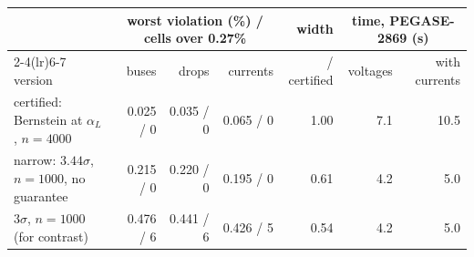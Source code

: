 \begin{tabular}{lrrrrrr}
\toprule
 & \multicolumn{3}{c}{worst violation (\%) / cells over 0.27\%} & width & \multicolumn{2}{c}{time, PEGASE-2869 (s)} \\
\cmidrule(lr){2-4}\cmidrule(lr){6-7}
version & buses & drops & currents & / certified & voltages & with currents \\
\midrule
certified: Bernstein at $\alpha_L$, $n = 4000$ & 0.025 / 0 & 0.035 / 0 & 0.065 / 0 & 1.00 & 7.1 & 10.5 \\
narrow: $3.44\sigma$, $n = 1000$, no guarantee & 0.215 / 0 & 0.220 / 0 & 0.195 / 0 & 0.61 & 4.2 & 5.0 \\
$3\sigma$, $n = 1000$ (for contrast) & 0.476 / 6 & 0.441 / 6 & 0.426 / 5 & 0.54 & 4.2 & 5.0 \\
\bottomrule
\end{tabular}
